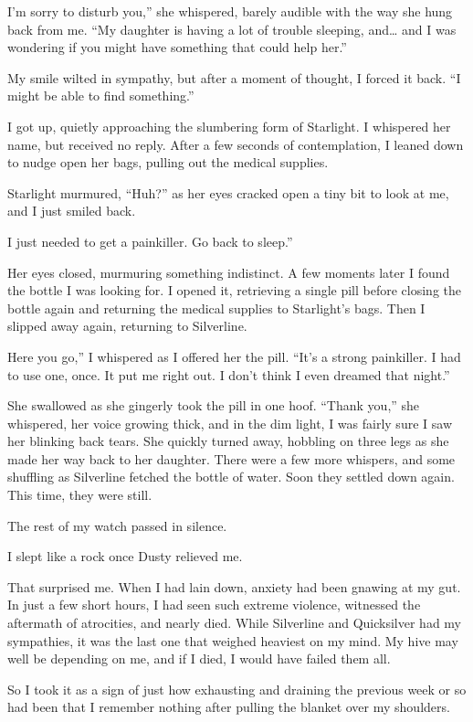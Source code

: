 \leavevmode{}I’m sorry to disturb you,” she whispered, barely audible with the way she hung back from me. “My daughter is having a lot of trouble sleeping, and… and I was wondering if you might have something that could help her.”

My smile wilted in sympathy, but after a moment of thought, I forced it back. “I might be able to find something.”

I got up, quietly approaching the slumbering form of Starlight. I whispered her name, but received no reply. After a few seconds of contemplation, I leaned down to nudge open her bags, pulling out the medical supplies.

Starlight murmured, “Huh?” as her eyes cracked open a tiny bit to look at me, and I just smiled back.

\leavevmode{}I just needed to get a painkiller. Go back to sleep.”

Her eyes closed, murmuring something indistinct. A few moments later I found the bottle I was looking for. I opened it, retrieving a single pill before closing the bottle again and returning the medical supplies to Starlight’s bags. Then I slipped away again, returning to Silverline.

\leavevmode{}Here you go,” I whispered as I offered her the pill. “It’s a strong painkiller. I had to use one, once. It put me right out. I don’t think I even dreamed that night.”

She swallowed as she gingerly took the pill in one hoof. “Thank you,” she whispered, her voice growing thick, and in the dim light, I was fairly sure I saw her blinking back tears. She quickly turned away, hobbling on three legs as she made her way back to her daughter. There were a few more whispers, and some shuffling as Silverline fetched the bottle of water. Soon they settled down again. This time, they were still.

The rest of my watch passed in silence.

{\br}%
I slept like a rock once Dusty relieved me.

That surprised me. When I had lain down, anxiety had been gnawing at my gut. In just a few short hours, I had seen such extreme violence, witnessed the aftermath of atrocities, and nearly died. While Silverline and Quicksilver had my sympathies, it was the last one that weighed heaviest on my mind. My hive may well be depending on me, and if I died, I would have failed them all.

So I took it as a sign of just how exhausting and draining the previous week or so had been that I remember nothing after pulling the blanket over my shoulders.

